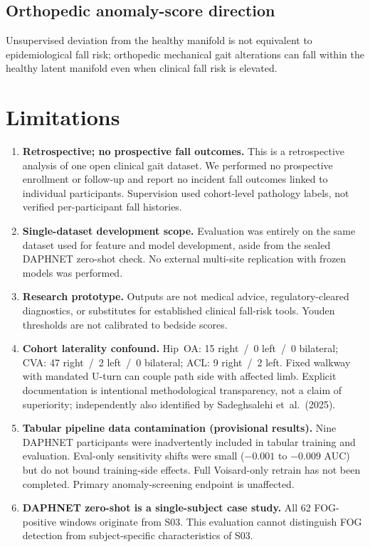 \documentclass[11pt,a4paper]{article}
\begin{document}
\subsection{Orthopedic anomaly-score direction}

Unsupervised deviation from the healthy manifold is not equivalent to epidemiological fall risk; orthopedic mechanical gait alterations can fall within the healthy latent manifold even when clinical fall risk is elevated.

\section{Limitations}

\begin{enumerate}[leftmargin=*]
  \item \textbf{Retrospective; no prospective fall outcomes.} This is a retrospective analysis of one open clinical gait dataset. We performed no prospective enrollment or follow-up and report no incident fall outcomes linked to individual participants. Supervision used cohort-level pathology labels, not verified per-participant fall histories.
  \item \textbf{Single-dataset development scope.} Evaluation was entirely on the same dataset used for feature and model development, aside from the sealed DAPHNET zero-shot check. No external multi-site replication with frozen models was performed.
  \item \textbf{Research prototype.} Outputs are not medical advice, regulatory-cleared diagnostics, or substitutes for established clinical fall-risk tools. Youden thresholds are not calibrated to bedside scores.
  \item \textbf{Cohort laterality confound.} Hip~OA: 15 right~/~0 left~/~0 bilateral; CVA: 47 right~/~2 left~/~0 bilateral; ACL: 9 right~/~2 left. Fixed walkway with mandated U-turn can couple path side with affected limb. Explicit documentation is intentional methodological transparency, not a claim of superiority; independently also identified by Sadeghsalehi et~al.\ (2025).
  \item \textbf{Tabular pipeline data contamination (provisional results).} Nine DAPHNET participants were inadvertently included in tabular training and evaluation. Eval-only sensitivity shifts were small ($-0.001$ to $-0.009$ AUC) but do not bound training-side effects. Full Voisard-only retrain has not been completed. Primary anomaly-screening endpoint is unaffected.
  \item \textbf{DAPHNET zero-shot is a single-subject case study.} All 62 FOG-positive windows originate from S03. This evaluation cannot distinguish FOG detection from subject-specific characteristics of S03.
\end{enumerate}
\end{document}
